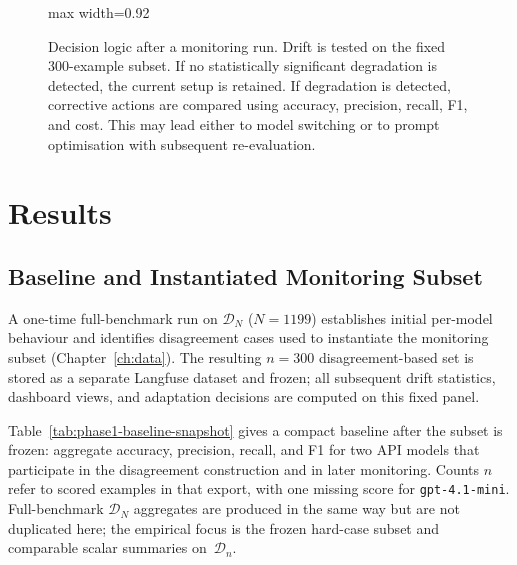 \begin{figure}[H]
\begin{adjustbox}{max width=0.92\textwidth}
    \end{adjustbox}
    \caption{Decision logic after a monitoring run. Drift is tested on the fixed 300-example subset. If no statistically significant degradation is detected, the current setup is retained. If degradation is detected, corrective actions are compared using accuracy, precision, recall, F1, and cost. This may lead either to model switching or to prompt optimisation with subsequent re-evaluation.}
    \label{fig:run-decision-logic}
    \end{figure}
    \FloatBarrier

\section{Results}

\subsection{Baseline and Instantiated Monitoring Subset}
\label{sec:baseline-subset}

A one-time full-benchmark run on $\mathcal{D}_N$ ($N=1199$) establishes initial per-model behaviour and identifies disagreement cases used to instantiate the monitoring subset (Chapter~\ref{ch:data}). The resulting $n=300$ disagreement-based set is stored as a separate Langfuse dataset and frozen; all subsequent drift statistics, dashboard views, and adaptation decisions are computed on this fixed panel.

Table~\ref{tab:phase1-baseline-snapshot} gives a compact baseline after the subset is frozen: aggregate accuracy, precision, recall, and F1 for two API models that participate in the disagreement construction and in later monitoring. Counts $n$ refer to scored examples in that export, with one missing score for \texttt{gpt-4.1-mini}. Full-benchmark $\mathcal{D}_N$ aggregates are produced in the same way but are not duplicated here; the empirical focus is the frozen hard-case subset and comparable scalar summaries on~$\mathcal{D}_n$.

